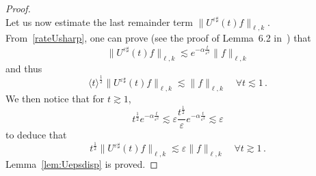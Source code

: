 \documentclass[11pt]{article}
\theoremstyle{definition}
\numberwithin{equation}{section}
\numberwithin{figure}{section}
\numberwithin{table}{section}
\newcommand*\eps{{\varepsilon}}
\let\oldforall\forall
\renewcommand*{\forall}{\mathrel{\oldforall}}
\begin{document}
\begin{proof}
\[\]
Let us now estimate the last remainder term $\|U^{\eps \sharp}(t) f\|_{\ell,k}$. From~\eqref{rateUsharp}, one can prove (see the proof of Lemma~6.2 in~\cite{Bardos-Ukai}) that
\begin{equation}\label{decayUepssharp}
\|U^{\eps \sharp}(t) f\|_{\ell,k} \lesssim e^{-\alpha \frac{t}{\eps^2}} \|f\|_{\ell,k}
\end{equation}
and thus
\[
\langle t \rangle^\frac12 \|U^{\eps \sharp}(t)f\|_{\ell,k}\lesssim \|f\|_{\ell,k} \quad \forall t \lesssim 1 \,.
\]
\goodbreak
We then notice that for $t \gtrsim 1$,
\[
t ^\frac12e^{-\alpha \frac{t}{\eps^2}} \lesssim \eps \frac{t^\frac12}{\eps} e^{-\alpha \frac{t}{\eps^2}} \lesssim \eps
\]
to deduce that
\[
t^\frac12 \|U^{\eps \sharp}(t)f\|_{\ell,k}\lesssim \eps \|f\|_{\ell,k} \quad \forall t \gtrsim 1 \,.
\]
Lemma~\ref{lem:Uepsdisp} is proved.
\end{proof}
\end{document}
